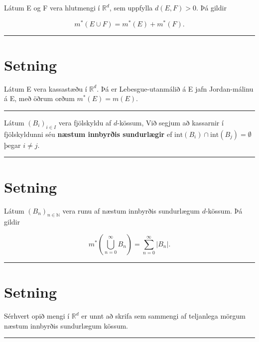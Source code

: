 \documentclass[]{book}
\begin{document}
Látum E og F vera hlutmengi í \(\mathbb R^d\), sem uppfylla \(d(E, F) > 0\). Þá gildir

\[
m^*(E\cup F) = m^*(E) + m^*(F).
\]

\begin{center}\rule{0.5\linewidth}{\linethickness}\end{center}

\hypertarget{setning-20}{%
\section{Setning}\label{setning-20}}

Látum E vera kassastæðu í \(\mathbb R^d\). Þá er Lebesgue-utanmálið á E jafn Jordan-málinu á E, með öðrum orðum \(m^*(E) = m(E)\).

\begin{center}\rule{0.5\linewidth}{\linethickness}\end{center}

Látum \((B_i)_{i\in I}\) vera fjölskyldu af \(d\)-kössum, Við segjum að kassarnir í fjölskyldunni séu \textbf{næstum innbyrðis sundurlægir} ef \(\text{int}(B_i)\cap\text{int}(B_j) = \emptyset\) þegar \(i \neq j\).

\begin{center}\rule{0.5\linewidth}{\linethickness}\end{center}

\hypertarget{setning-21}{%
\section{Setning}\label{setning-21}}

Látum \((B_n)_{n\in\mathbb N}\) vera runu af næstum innbyrðis sundurlægum \(d\)-kössum. Þá gildir

\[
m^*(\bigcup_{n=0}^\infty B_n) = \sum_{n=0}^\infty|B_n|.
\]

\begin{center}\rule{0.5\linewidth}{\linethickness}\end{center}

\hypertarget{setning-22}{%
\section{Setning}\label{setning-22}}

Sérhvert opið mengi í \(\mathbb R^d\) er unnt að skrifa sem sammengi af teljanlega mörgum næstum innbyrðis sundurlægum kössum.

\begin{center}\rule{0.5\linewidth}{\linethickness}\end{center}
\end{document}
